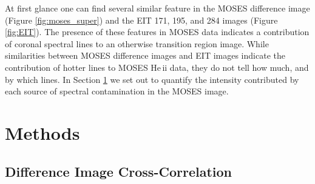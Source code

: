 		At first glance one can find several similar feature in the MOSES difference image (Figure \ref{fig:moses_super}) and the EIT 171, 195, and 284 images (Figure \ref{fig:EIT}).  
		The presence of these features in MOSES data indicates a contribution of coronal spectral lines to an otherwise transition region image.  
		While similarities between MOSES difference images and EIT images indicate the contribution of hotter lines to MOSES He\,{\sc ii} data, they do not tell how much, and by which lines.  
		In Section \ref{sec:methods} we set out to quantify the intensity contributed by each source of spectral contamination in the MOSES image.
		
		
\section{Methods}\label{sec:methods}
 	\subsection{Difference Image Cross-Correlation}\label{sec:crosscorrelation}
 	
